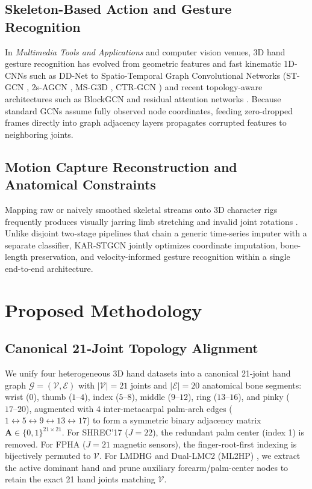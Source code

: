 \documentclass[10pt,twocolumn]{article}
\begin{document}
\subsection{Skeleton-Based Action and Gesture Recognition}
In \textit{Multimedia Tools and Applications} and computer vision venues, 3D hand gesture recognition has evolved from geometric features \cite{marin2016hand,boulahia2017dynamic,kumar2018position} and fast kinematic 1D-CNNs such as DD-Net \cite{yang2019make} to Spatio-Temporal Graph Convolutional Networks (ST-GCN \cite{yan2018spatial}, 2s-AGCN \cite{shi2019two}, MS-G3D \cite{liu2020disentangling}, CTR-GCN \cite{chen2021channel}) and recent topology-aware architectures such as BlockGCN \cite{zhou2024blockgcn} and residual attention networks \cite{asteasuain2022applying,liu2024novel,rastgoo2025deep,dhanjal2025multilingual}. Because standard GCNs assume fully observed node coordinates, feeding zero-dropped frames directly into graph adjacency layers propagates corrupted features to neighboring joints.

\subsection{Motion Capture Reconstruction and Anatomical Constraints}
Mapping raw or naively smoothed skeletal streams onto 3D character rigs frequently produces visually jarring limb stretching and invalid joint rotations \cite{tirakoat2011optimized,noiumkar2013use}. Unlike disjoint two-stage pipelines that chain a generic time-series imputer with a separate classifier, KAR-STGCN jointly optimizes coordinate imputation, bone-length preservation, and velocity-informed gesture recognition within a single end-to-end architecture.

\section{Proposed Methodology}

\subsection{Canonical 21-Joint Topology Alignment}
We unify four heterogeneous 3D hand datasets into a canonical 21-joint hand graph $\mathcal{G} = (\mathcal{V}, \mathcal{E})$ with $|\mathcal{V}|=21$ joints and $|\mathcal{E}|=20$ anatomical bone segments: wrist ($0$), thumb ($1\text{--}4$), index ($5\text{--}8$), middle ($9\text{--}12$), ring ($13\text{--}16$), and pinky ($17\text{--}20$), augmented with 4 inter-metacarpal palm-arch edges ($1\leftrightarrow 5\leftrightarrow 9\leftrightarrow 13\leftrightarrow 17$) to form a symmetric binary adjacency matrix $\mathbf{A} \in \{0,1\}^{21\times 21}$. For SHREC'17 \cite{desmedt2017shrec} ($J=22$), the redundant palm center (index 1) is removed. For FPHA \cite{garcia2018first} ($J=21$ magnetic sensors), the finger-root-first indexing is bijectively permuted to $\mathcal{V}$. For LMDHG \cite{boulahia2017dynamic} and Dual-LMC2 (ML2HP) \cite{gilmartin2024dual}, we extract the active dominant hand and prune auxiliary forearm/palm-center nodes to retain the exact 21 hand joints matching $\mathcal{V}$.
\end{document}
